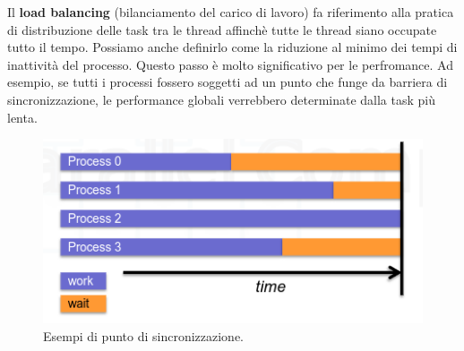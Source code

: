 Il \textbf{load balancing} (bilanciamento del carico di lavoro) fa riferimento alla pratica di distribuzione delle task tra le thread affinchè tutte le thread siano occupate tutto il tempo. Possiamo anche definirlo come la riduzione al minimo dei tempi di inattività del processo. Questo passo è molto significativo per le perfromance. Ad esempio, se tutti i processi fossero soggetti ad un punto che funge da barriera di sincronizzazione, le performance globali verrebbero determinate dalla task più lenta.
\begin{figure}[th]
	\centering
	\includegraphics[width=0.7\linewidth]{img/barrier-sync.png}
	\caption{Esempi di punto di sincronizzazione.}
	\label{fig:barrier-sync}
\end{figure}

